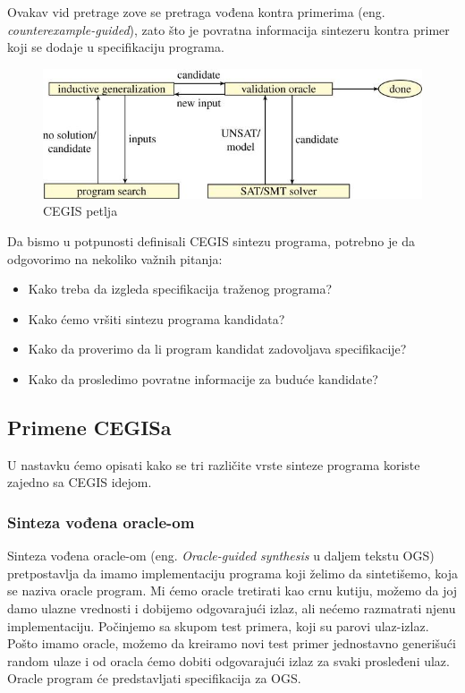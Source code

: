 Ovakav vid pretrage zove se pretraga vođena kontra primerima (eng. \emph{counterexample-guided}), zato što je povratna informacija sintezeru kontra primer koji se dodaje u specifikaciju programa.


\begin{figure}[h!]
\begin{center}
\includegraphics[scale=0.4]{resources/cegis.jpeg}
\end{center}
\caption{CEGIS petlja \cite{AboutPS}}
\label{fig:cegis}
\end{figure}


Da bismo u potpunosti definisali CEGIS sintezu programa, potrebno je da odgovorimo na nekoliko važnih pitanja:

\begin{itemize}
  \item Kako treba da izgleda specifikacija traženog programa?
  \item Kako ćemo vršiti sintezu programa kandidata?
  \item Kako da proverimo da li program kandidat zadovoljava specifikacije?
  \item Kako da prosledimo povratne informacije za buduće kandidate?
\end{itemize}


\subsection{Primene CEGISa}
\label{subsec:primeneCEGISa}

U nastavku ćemo opisati kako se tri različite vrste sinteze programa koriste zajedno sa CEGIS idejom.

\subsubsection{Sinteza vođena oracle-om}
\label{subsec:oracleGuidedSynthesis}

Sinteza vođena oracle-om (eng. \emph{Oracle-guided synthesis} u daljem tekstu OGS) pretpostavlja da imamo implementaciju programa koji želimo da sintetišemo, koja se naziva oracle program. Mi ćemo oracle tretirati kao crnu kutiju, možemo da joj damo ulazne vrednosti i dobijemo odgovarajući izlaz, ali nećemo razmatrati njenu implementaciju.  Počinjemo sa skupom test primera, koji su parovi ulaz-izlaz. Pošto imamo oracle, možemo da kreiramo novi test primer jednostavno generišući random ulaze i od oracla ćemo dobiti odgovarajući izlaz za svaki prosleđeni ulaz. Oracle program će predstavljati specifikacija za OGS.


